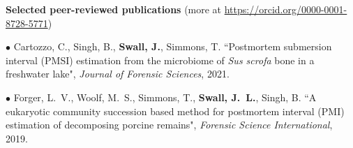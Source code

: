 \documentclass[11pt]{article}
\def\newsectn{\vspace*{0.6cm}}
\def\newitem{\vspace*{0.2cm}}
\begin{document}










\newsectn
{\Large \textbf{Selected peer-reviewed publications}} (more at
\url{https://orcid.org/0000-0001-8728-5771})


$\bullet$ Cartozzo, C., Singh, B., \textbf{Swall, J.},  Simmons, T.
``Postmortem submersion interval (PMSI) estimation from the microbiome of
\textit{Sus scrofa} bone in a freshwater lake", \textit{Journal of
Forensic Sciences}, 2021.

$\bullet$ Forger, L.~V., Woolf, M.~S., Simmons, T., \textbf{Swall, J.~L.},
Singh, B.  ``A eukaryotic community succession based method for
postmortem interval (PMI) estimation of decomposing porcine
remains", \textit{Forensic Science International}, 2019.
\end{document}
